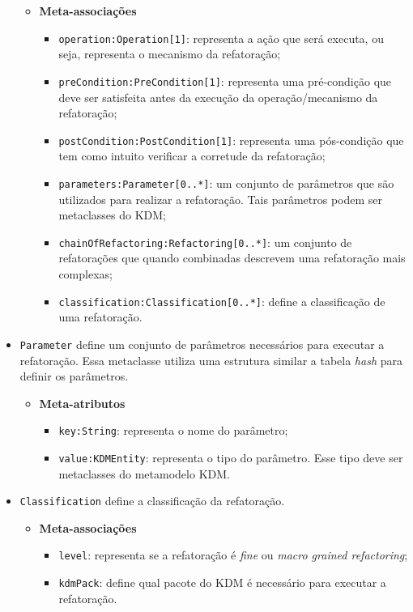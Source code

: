 \begin{itemize}
\begin{itemize}
	\item \textbf{Meta-associações}
		\begin{itemize}
			\item \texttt{operation:Operation[1]}: representa a ação que será executa, ou seja, representa o mecanismo da refatoração;
			\item \texttt{preCondition:PreCondition[1]}: representa uma pré-condição que deve ser satisfeita antes da execução da operação/mecanismo da refatoração;
			\item \texttt{postCondition:PostCondition[1]}: representa uma pós-condição que tem como intuito verificar a corretude da refatoração;
			\item \texttt{parameters:Parameter[0..*]}: um conjunto de parâmetros que são utilizados para realizar a refatoração. Tais parâmetros podem ser metaclasses do KDM;
			\item \texttt{chainOfRefactoring:Refactoring[0..*]}: um conjunto de refatorações que quando combinadas descrevem uma refatoração mais complexas;
			\item \texttt{classification:Classification[0..*]}: define a classificação de uma refatoração.
		\end{itemize}	
\end{itemize} 

\item \texttt{Parameter} define um conjunto de parâmetros necessários para executar a refatoração. Essa metaclasse utiliza uma estrutura similar a tabela \textit{hash} para definir os parâmetros.

\begin{itemize}
	\item \textbf{Meta-atributos}
		\begin{itemize}
			\item \texttt{key:String}: representa o nome do parâmetro;
			\item \texttt{value:KDMEntity}: representa o tipo do parâmetro. Esse tipo deve ser metaclasses do metamodelo KDM.
		\end{itemize}	
\end{itemize} 

\item \texttt{Classification} define a classificação da refatoração.

\begin{itemize}
	\item \textbf{Meta-associações}
		\begin{itemize}
			\item \texttt{level}: representa se a refatoração é \textit{fine} ou \textit{macro grained refactoring};
			\item \texttt{kdmPack}: define qual pacote do KDM é necessário para executar a refatoração.
		\end{itemize}	
\end{itemize} 


\end{itemize}
